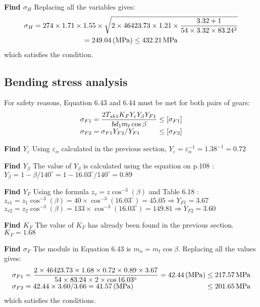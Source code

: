 \textbf{Find $ \sigma_H $} Replacing all the variables gives:
\begin{multline*}
	\sigma_H = 274\times 1.71 \times 1.55 \times \sqrt{2\times 46423.73 \times 1.21 \times\dfrac{3.32+1}{54 \times 3.32 \times 83.24^2}}\\
	 = 249.04 \, (\mathrm{MPa}) \leq 432.21 \, \mathrm{MPa}
\end{multline*}
which satisfies the condition.
\subsection{Bending stress analysis}
For safety reasons, Equation 6.43 and 6.44 \cite{tk1} must be met for both pairs of gears:
\[
\begin{array}{l@{{} \leq {}}l}
\sigma_{F1} = \dfrac{2T_{sh1}K_FY_\varepsilon Y_\beta Y_{F1}}{bd_1m_t\cos\beta} & [\sigma_{F1}]\\ 
\sigma_{F2} = \sigma_{F1}Y_{F2}/Y_{F1} & [\sigma_{F2}]
\end{array}
\]

\textbf{Find $ Y_\varepsilon $} Using $ \varepsilon_\alpha $ calculated in the previous section, 
$ Y_\varepsilon= \varepsilon_\alpha^{-1} = 1.38^{-1} = 0.72 $

\textbf{Find $ Y_\beta $} The value of $ Y_\beta $ is calculated using the equation on p.108 \cite{tk1}:\\
$ Y_\beta = 1-{\beta}/{140^\circ}=  1-{16.03^\circ}/{140^\circ}= 0.89$

\textbf{Find $ Y_F $} Using the formula $ z_v = z\cos^{-3}(\beta) $ and Table 6.18 \cite{tk1}:\\
$ z_{v1} = z_1\cos^{-3}(\beta) = 40\times\cos^{-3}(16.03^\circ) = 45.05\Rightarrow Y_{F1} = 3.67 $\\
$ z_{v2} = z_2\cos^{-3}(\beta) = 133\times\cos^{-3}(16.03^\circ) = 149.81\Rightarrow Y_{F2} = 3.60 $

\textbf{Find $ K_F $} The value of $ K_F $ has already been found in the previous section. $ K_F = 1.68 $

\textbf{Find $ \sigma_F $} The module in Equation 6.43 \cite{tk1} is $ m_n = m_t\cos\beta $. Replacing all the values gives:
\[
\begin{array}{l@{{} \leq {}}l}
\sigma_{F1} = \dfrac{2\times 46423.73 \times 1.68 \times 0.72 \times 0.89 \times 3.67}{54 \times 83.24 \times 2 \times\cos16.03^\circ} = 42.44 \unitp{MPa} & 217.57 \unit{MPa}\\ 
\sigma_{F2} = {42.44 \times 3.60}/{3.66} = 41.57 \unitp{MPa}& 201.65 \unit{MPa}
\end{array}
\]
which satisfies the conditions.
